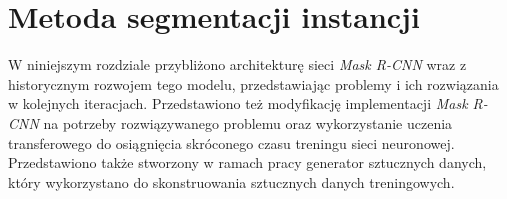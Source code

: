 \chapter{Metoda segmentacji instancji}
W niniejszym rozdziale przybliżono architekturę sieci \textit{Mask R-CNN} wraz z historycznym rozwojem tego modelu, przedstawiając problemy i ich rozwiązania w kolejnych iteracjach. Przedstawiono też modyfikację implementacji \textit{Mask R-CNN} na potrzeby rozwiązywanego problemu oraz wykorzystanie uczenia transferowego do osiągnięcia skróconego czasu treningu sieci neuronowej.
Przedstawiono także stworzony w ramach pracy generator sztucznych danych, który wykorzystano do skonstruowania sztucznych danych treningowych.
